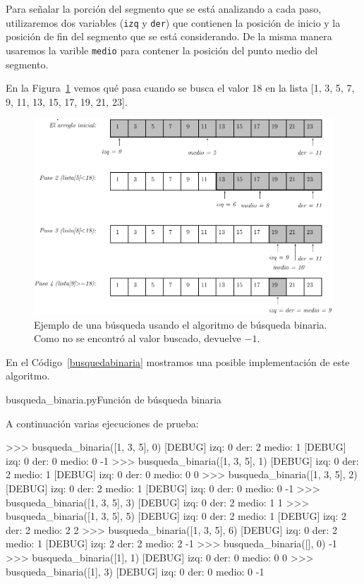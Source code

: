 Para señalar la porción del segmento que se está analizando a cada paso,
utilizaremos dos variables (\lstinline!izq! y \lstinline!der!) que
contienen la posición de inicio y la posición de fin del segmento que se
está considerando. De la misma manera usaremos la varible \lstinline!medio!
para contener la posición del punto medio del segmento.

En la Figura~\ref{fig:busqbin} vemos qué pasa cuando se busca
el valor 18 en la lista [1, 3, 5, 7, 9, 11, 13, 15, 17, 19, 21, 23].

\begin{figure}[h!t]
\begin{center}
\includegraphics[width=\linewidth]{graficos/uni8-seguimiento}
\end{center}
\caption{Ejemplo de una búsqueda usando el algoritmo de búsqueda binaria.
Como no se encontró al valor buscado, devuelve $-1$.}
\label{fig:busqbin}
\end{figure}

En el Código~\ref{busquedabinaria} mostramos una posible implementación de
este algoritmo.

\begin{codigo}{busqueda\_binaria.py}{Función de búsqueda binaria}
\label{busquedabinaria}

\end{codigo}

A continuación varias ejecuciones de prueba:

\begin{codigo-python-sn}
>>> busqueda_binaria([1, 3, 5], 0)
[DEBUG] izq: 0 der: 2 medio: 1
[DEBUG] izq: 0 der: 0 medio: 0
-1
>>> busqueda_binaria([1, 3, 5], 1)
[DEBUG] izq: 0 der: 2 medio: 1
[DEBUG] izq: 0 der: 0 medio: 0
0
>>> busqueda_binaria([1, 3, 5], 2)
[DEBUG] izq: 0 der: 2 medio: 1
[DEBUG] izq: 0 der: 0 medio: 0
-1
>>> busqueda_binaria([1, 3, 5], 3)
[DEBUG] izq: 0 der: 2 medio: 1
1
>>> busqueda_binaria([1, 3, 5], 5)
[DEBUG] izq: 0 der: 2 medio: 1
[DEBUG] izq: 2 der: 2 medio: 2
2
>>> busqueda_binaria([1, 3, 5], 6)
[DEBUG] izq: 0 der: 2 medio: 1
[DEBUG] izq: 2 der: 2 medio: 2
-1
>>> busqueda_binaria([], 0)
-1
>>> busqueda_binaria([1], 1)
[DEBUG] izq: 0 der: 0 medio: 0
0
>>> busqueda_binaria([1], 3)
[DEBUG] izq: 0 der: 0 medio: 0
-1
\end{codigo-python-sn}

